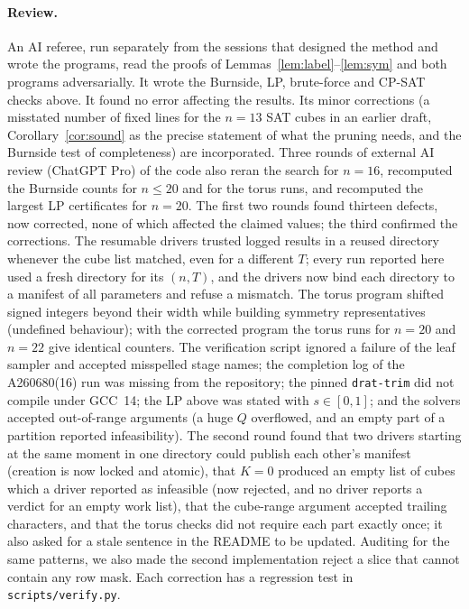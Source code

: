 \documentclass[11pt]{article}
\theoremstyle{remark}
\begin{document}
\paragraph{Review.} An AI referee, run separately from the sessions that designed the method and wrote the
programs, read the proofs
of Lemmas~\ref{lem:label}--\ref{lem:sym} and both programs adversarially. It wrote the Burnside, LP,
brute-force and CP-SAT checks above. It found no error affecting the results. Its minor corrections (a
misstated number of fixed lines for the $n=13$ SAT cubes in an earlier draft, Corollary~\ref{cor:sound}
as the precise statement of what the pruning needs, and the Burnside test of completeness) are
incorporated. Three rounds of external AI review (ChatGPT Pro) of the code also reran the search for
$n=16$, recomputed the Burnside counts for $n\le20$ and for the torus runs, and recomputed the largest
LP certificates for $n=20$. The first two rounds found thirteen defects, now corrected, none of which
affected the claimed values; the third confirmed the corrections. The resumable drivers trusted logged results in a reused directory whenever
the cube list matched, even for a different $T$; every run reported here used a fresh directory for its
$(n,T)$, and the drivers now bind each directory to a manifest of all parameters and refuse a mismatch.
The torus program shifted signed integers beyond their width while building symmetry representatives
(undefined behaviour); with the corrected program the torus runs for $n=20$ and $n=22$ give identical
counters. The verification script ignored a failure of the leaf sampler and accepted misspelled stage
names; the completion log of the A260680(16) run was missing from the repository; the pinned
\texttt{drat-trim} did not compile under GCC~14; the LP above was stated with $s\in[0,1]$; and the
solvers accepted out-of-range arguments (a huge $Q$ overflowed, and an empty part of a partition reported
infeasibility). The second round found that two drivers starting at the same moment in one directory
could publish each other's manifest (creation is now locked and atomic), that $K=0$ produced an empty
list of cubes which a driver reported as infeasible (now rejected, and no driver reports a verdict for an
empty work list), that the cube-range argument accepted trailing characters, and that the torus checks
did not require each part exactly once; it also asked for a stale sentence in the README to be updated. Auditing for the same patterns, we also made
the second implementation reject a slice that cannot contain any row mask. Each correction has a regression test in \texttt{scripts/verify.py}.
\end{document}
